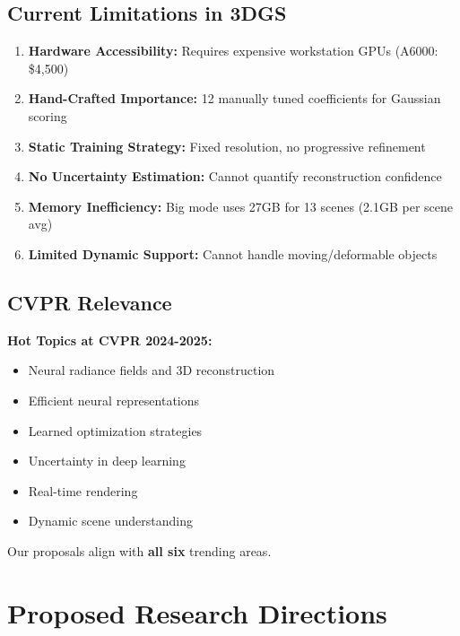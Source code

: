 \documentclass[11pt,letterpaper]{article}
\begin{document}
\subsection{Current Limitations in 3DGS}

\begin{enumerate}[leftmargin=*]
    \item \textbf{Hardware Accessibility:} Requires expensive workstation GPUs (A6000: \$4,500)
    \item \textbf{Hand-Crafted Importance:} 12 manually tuned coefficients for Gaussian scoring
    \item \textbf{Static Training Strategy:} Fixed resolution, no progressive refinement
    \item \textbf{No Uncertainty Estimation:} Cannot quantify reconstruction confidence
    \item \textbf{Memory Inefficiency:} Big mode uses 27GB for 13 scenes (2.1GB per scene avg)
    \item \textbf{Limited Dynamic Support:} Cannot handle moving/deformable objects
\end{enumerate}

\subsection{CVPR Relevance}

\textbf{Hot Topics at CVPR 2024-2025:}
\begin{itemize}[leftmargin=*]
    \item Neural radiance fields and 3D reconstruction
    \item Efficient neural representations
    \item Learned optimization strategies
    \item Uncertainty in deep learning
    \item Real-time rendering
    \item Dynamic scene understanding
\end{itemize}

Our proposals align with \textbf{all six} trending areas.

\section{Proposed Research Directions}
\end{document}
